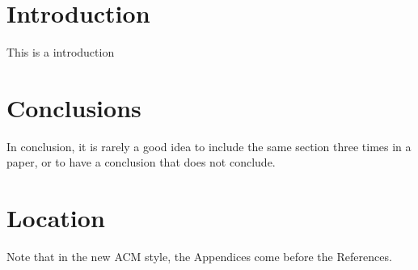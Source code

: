 \section{Introduction}

This is a introduction




\section{Conclusions}

In conclusion, it is rarely a good idea to include the same section three times in a paper, or to have a conclusion that does not conclude.

\appendix

\section{Location}

Note that in the new ACM style, the Appendices come before the References.



\begin{acks}
\end{acks}
